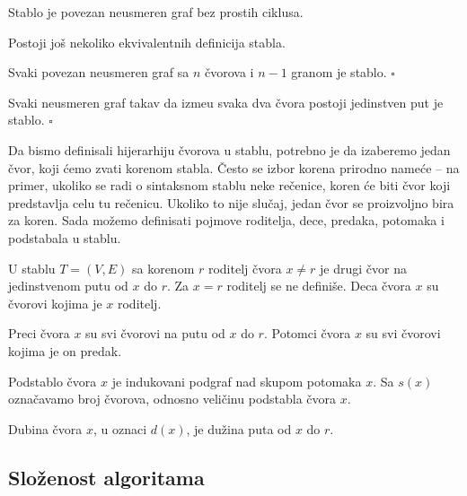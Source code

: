 \begin{dfn}
Stablo je povezan neusmeren graf bez prostih ciklusa.
\end{dfn}

Postoji jo\v s nekoliko ekvivalentnih definicija stabla.

\begin{thm}
Svaki povezan neusmeren graf sa $n$ \v cvorova i $n-1$ granom je stablo. \hfill $\square$
\end{thm}

\begin{thm}
Svaki neusmeren graf takav da izme\dj u svaka dva \v cvora postoji jedinstven put je stablo. \hfill $\square$
\end{thm}

Da bismo definisali hijerarhiju \v cvorova u stablu, potrebno je da izaberemo jedan \v cvor, koji \' cemo zvati korenom stabla. \v Cesto se izbor korena prirodno name\' ce -- na primer, ukoliko se radi o sintaksnom stablu neke re\v cenice, koren \' ce biti \v cvor koji predstavlja celu tu re\v cenicu. Ukoliko to nije slu\v caj, jedan \v cvor se proizvoljno bira za koren. Sada mo\v zemo definisati pojmove roditelja, dece, predaka, potomaka i podstabala u stablu.

\begin{dfn}
U stablu $T=(V,E)$ sa korenom $r$ roditelj \v cvora $x \not = r$ je drugi \v cvor na jedinstvenom putu od $x$ do $r$. Za $x=r$ roditelj se ne defini\v se. Deca \v cvora $x$ su \v cvorovi kojima je $x$ roditelj.
\end{dfn}

\begin{dfn}
Preci \v cvora $x$ su svi \v cvorovi na putu od $x$ do $r$. Potomci \v cvora $x$ su svi \v cvorovi kojima je on predak.
\end{dfn}

\begin{dfn}
Podstablo \v cvora $x$ je indukovani podgraf nad skupom potomaka $x$. Sa $s(x)$ ozna\v cavamo broj \v cvorova, odnosno veli\v cinu podstabla \v cvora $x$.
\end{dfn}

\begin{dfn}
Dubina \v cvora $x$, u oznaci $d(x)$, je du\v zina puta od $x$ do $r$.
\end{dfn}

\subsection{Slo\v zenost algoritama}

